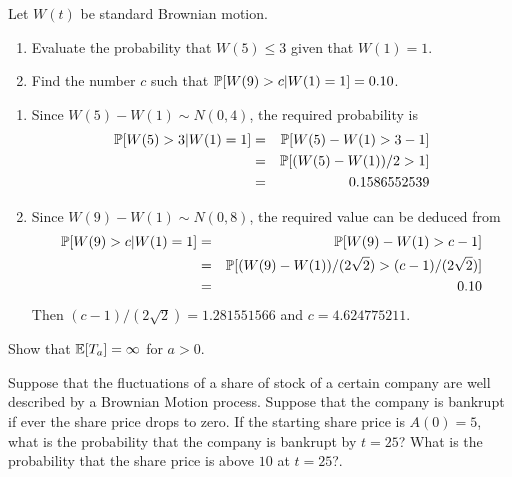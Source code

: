 \begin{problem}
 Let $ W(t) $ be standard Brownian motion.
  \begin{enumerate}
      \item
          Evaluate the probability that $ W(5) \le 3 $ given that $
          W(1) = 1 $.
      \item
          Find the number $ c $ such that $ \P[ W(9) > c | W(1)
          =1 ] = 0.10 $.
  \end{enumerate}


\begin{sol}

\begin{enumerate}
    \item
        Since $ W(5) - W(1) \sim N(0,4) $, the required
        probability is
        \begin{eqnarray*}
            \P[ W(5) > 3 | W(1) = 1] &=& \P[ W(5) - W(1) > 3 -
            1] \\
            &=& \P[ ( W(5) - W(1))/2 > 1] \\
            &=& 0.1586552539
        \end{eqnarray*}
    \item
        Since $ W(9) - W(1) \sim N(0,8) $, the required value
        can be deduced from
        \begin{eqnarray*}
            \P[ W(9) > c | W(1) = 1] &=& \P[ W(9) - W(1) > c -
            1] \\
            &=& \P[ ( W(9) - W(1))/(2\sqrt{2}) > (c -1)/(2\sqrt
            {2}) ] \\
            &=& 0.10
        \end{eqnarray*}
        Then $ (c -1)/(2 \sqrt{2}) = 1.281551566 $ and $ c=
        4.624775211 $.
\end{enumerate}
\end{sol}
\end{problem}

\begin{problem}
  Show that \( \E[T_a] = \infty \) for $ a > 0 $.

\begin{sol}

\end{sol}
\end{problem}

\begin{problem}
  Suppose that the fluctuations of a share of stock of a certain
  company are well described by a Brownian Motion process. Suppose
  that the company is bankrupt if ever the share price drops to
  zero.  If the starting share price is $ A(0) = 5 $, what is the
  probability that the company is bankrupt by $ t = 25 $?  What is
  the probability that the share price is above $ 10 $ at $ t = 25$?.


\begin{sol}

\end{sol}
\end{problem}

